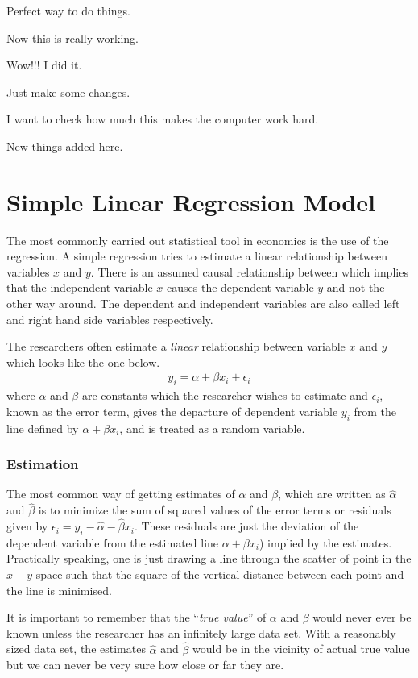 \documentclass[12pt,onesided]{article}
\begin{document}
Perfect way to do things.

Now this is really working.

Wow!!! I did it.

Just make some changes.

I want to check how much this makes the computer work hard.

New things added here. 

\section{Simple Linear Regression Model}

The most commonly carried out statistical tool in economics is the use of the regression. A simple regression tries to estimate a
linear relationship between variables $x$ and $y$. There is an
assumed causal relationship between which implies that the
independent variable $x$ causes the dependent variable $y$ and not
the other way around. The dependent and independent variables are
also called left and right hand side variables respectively.

The researchers often estimate a \emph{linear} relationship between
variable $x$ and $y$ which looks like the one below.
\begin{align*}
    y_i= \alpha + \beta x_i + \epsilon_i
\end{align*}
where $\alpha$ and $\beta$ are constants which the researcher wishes
to estimate and $\epsilon_i$, known as the error term, gives the
departure of dependent variable $y_i$ from the line defined by
$\alpha + \beta x_i$, and is treated as a random variable.

\subsubsection*{Estimation}

The most common way of getting estimates of $\alpha$ and $\beta$, which are written as $\hat{\alpha}$ and $\hat{\beta}$ is to minimize the sum of squared values of the error terms or residuals given by $\epsilon_i=y_i-\hat{\alpha}-\hat{\beta}x_i$. These residuals are just the deviation of the dependent variable from the estimated line $\alpha + \beta x_i$) implied by the estimates. Practically speaking, one is just drawing a line through the scatter of point in the $x-y$ space such that the square of the vertical distance between each point and the line is minimised.

It is important to remember that the ``\emph{true value}'' of
$\alpha$ and $\beta$ would never ever be known unless the researcher
has an infinitely large data set. With a reasonably sized data set,
the estimates $\hat{\alpha}$ and $\hat{\beta}$ would be in the
vicinity of actual true value but we can never be very sure how
close or far they are.
\end{document}
